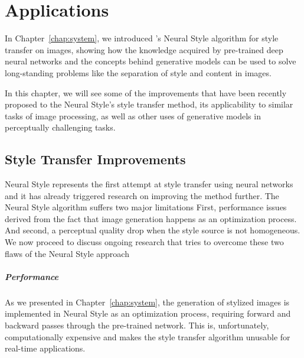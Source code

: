 
\chapter{Applications}
\label{chap:applications}




In Chapter~\ref{chap:system}, we introduced \citeauthor{Gatys2015B}'s Neural Style algorithm for style transfer on images, showing how the knowledge acquired by pre-trained deep neural networks and the concepts behind generative models can be used to solve long-standing problems like the separation of style and content in images.

In this chapter, we will see some of the improvements that have been recently proposed to the Neural Style's style transfer method, its applicability to similar tasks of image processing, as well as other uses of generative models in perceptually challenging tasks.



\section{Style Transfer Improvements}
\label{sec:applications:improvements}

Neural Style represents the first attempt at style transfer using neural networks and it has already triggered research on improving the method further.
The Neural Style algorithm suffers two major limitations
First, performance issues derived from the fact that image generation happens as an optimization process.
And second, a perceptual quality drop when the style source is not homogeneous.
We now proceed to discuss ongoing research that tries to overcome these two flaws of the Neural Style approach

\paragraph{Performance}
As we presented in Chapter~\ref{chap:system}, the generation of stylized images is implemented in Neural Style as an optimization process, requiring forward and backward passes through the pre-trained network.
This is, unfortunately, computationally expensive and makes the style transfer algorithm unusable for real-time applications.

